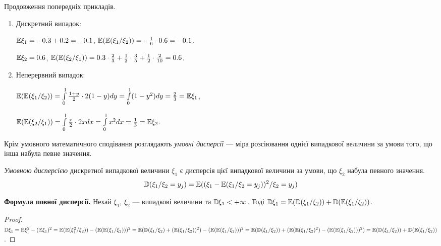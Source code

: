 \begin{example}
    Продовження попередніх прикладів.
    \begin{enumerate}
        \item Дискретний випадок:
        
        $\mathbb{E}\xi_1 = -0.3 + 0.2 = -0.1$, $\mathbb{E}(\mathbb{E}(\xi_1 / \xi_2)) = -\frac{1}{6}
        \cdot0.6 = -0.1$.
    
        $\mathbb{E}\xi_2 = 0.6$, $\mathbb{E}(\mathbb{E}(\xi_2 / \xi_1)) = 0.3\cdot\frac{2}{3} + 
        \frac{1}{2}\cdot\frac{3}{5} + \frac{1}{2} \cdot\frac{2}{10} = 
        0.6$.
        \item Неперервний випадок:

        $\mathbb{E}(\mathbb{E}(\xi_1 / \xi_2)) = \int\limits_0^1 \frac{1+y}{2} \cdot 2(1-y) dy = \int\limits_0^1 (1-y^2) dy = \frac{2}{3} = \mathbb{E}\xi_1$,

        $\mathbb{E}(\mathbb{E}(\xi_2 / \xi_1)) = \int\limits_0^1 \frac{x}{2} \cdot 2x dx = \int\limits_0^1 x^2 dx = \frac{1}{3} = \mathbb{E}\xi_2$.
    \end{enumerate}
\end{example}


Крім умовного математичного сподівання розглядають
\emph{умовні дисперсії} --- міра розсіювання однієї випадкової величини 
за умови того, що інша набула певне значення.

\begin{definition}
    \emph{Умовною дисперсією} дискретної випадкової величини $\xi_1$ 
    є дисперсія цієї випадкової величини за умови, що 
    $\xi_2$ набула певного значення.
    $$\mathbb{D}(\xi_1 / \xi_2 = y_j) = 
    \mathbb{E}((\xi_1 - \mathbb{E}(\xi_1 / \xi_2 = y_j))^2/\xi_2 = y_j)$$
\end{definition}

\noindent\textbf{Формула повної дисперсії.}
    Нехай $\xi_1$, $\xi_2$ --- випадкові величини та $\mathbb{D}\xi_1 < +\infty$. 
    Тоді
    $\mathbb{D}\xi_1 = \mathbb{E}(\mathbb{D}(\xi_1/\xi_2)) + \mathbb{D}(\mathbb{E}(\xi_1 / \xi_2))$.

\begin{proof}
    $\mathbb{D}\xi_1 = \mathbb{E}\xi_1^2 - (\mathbb{E} \xi_1)^2 = 
    \mathbb{E}(\mathbb{E}(\xi_1^2 / \xi_2)) - (\mathbb{E}(\mathbb{E}(\xi_1/\xi_2)))^2 = 
    \mathbb{E}(\mathbb{D}(\xi_1/\xi_2) + (\mathbb{E}(\xi_1/\xi_2))^2) - (\mathbb{E}(\mathbb{E}(\xi_1/\xi_2)))^2 = 
    \mathbb{E}(\mathbb{D}(\xi_1 / \xi_2)) + (\mathbb{E}(\mathbb{E}(\xi_1/\xi_2)^2) - 
    (\mathbb{E}(\mathbb{E}(\xi_1 / \xi_2)))^2) = \mathbb{E}(\mathbb{D}(\xi_1/\xi_2)) + \mathbb{D}(\mathbb{E}(\xi_1/\xi_2))$.
\end{proof}


